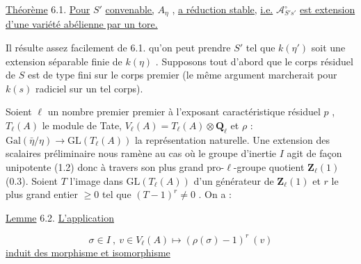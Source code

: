 \underline{Théorème} 6.1. \underline{Pour} $S'$ \underline{convenable,} $A_{\eta}$ , \underline{a réduction stable,} \underline{i.e.} $\mathcal{A}^{\circ}_{S's'}$ \underline{est extension d'une variété abélienne par un tore.}

Il résulte assez facilement de 6.1. qu'on peut prendre $S'$ tel que $k(\eta')$ soit une extension séparable finie de $k(\eta)$ . Supposons tout d'abord que le corps résiduel de $S$ est de type fini sur le corps premier (le même argument marcherait pour $k(s)$ radiciel sur un tel corps).

Soient $\ell$ un nombre premier premier à l'exposant caractéristique résiduel $p$ , $T_{\ell}(A)$ le module de Tate, $V_{\ell}(A) = T_{\ell}(A) \otimes \mathbf{Q}_{\ell}$ et $\rho$ : $\mathrm{Gal}(\bar{\eta}/\eta) \longrightarrow \mathrm{GL}(T_{\ell}(A))$ la représentation naturelle. Une extension des scalaires préliminaire  nous ramène au cas où le groupe d'inertie $I$ agit de façon unipotente (1.2) donc à travers son plus grand pro-$\ell$-groupe quotient $\mathbf{Z}_{\ell}(1)$ (0.3). Soient $T$ l'image dans $\mathrm{GL}(T_{\ell}(A))$ d'un générateur de $\mathbf{Z}_{\ell}(1)$ et $r$ le plus grand entier $\geqslant 0$ tel que $(T-1)^{r} \neq 0$ . On a :

\underline{Lemme} 6.2. \underline{L'application}

\begin{equation*}
\sigma \in I \ , \ v \in V_{\ell}(A) \longmapsto (\rho(\sigma)-1)^{r} \ (v)
\end{equation*}
\underline{induit des morphisme et isomorphisme}

